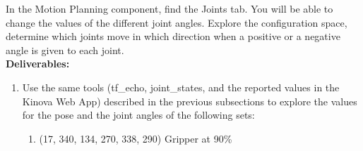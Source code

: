 \documentclass[12pt]{article}
\begin{document}
In the Motion Planning component, find the Joints tab. You will be able to change the values of the different joint angles. Explore the configuration space, determine which joints move in which direction when a positive or a negative angle is given to each joint.\\

\textbf{Deliverables:}
\begin{enumerate}

    \item Use the same tools (tf\_echo, joint\_states, and the reported values in the Kinova Web App) described in the previous subsections to explore the values for the pose and the joint angles of the following sets:
    
    \begin{enumerate}
        
        \item (17, 340, 134, 270, 338, 290) Gripper at 90\%
        

\end{enumerate}
\end{enumerate}
\end{document}
